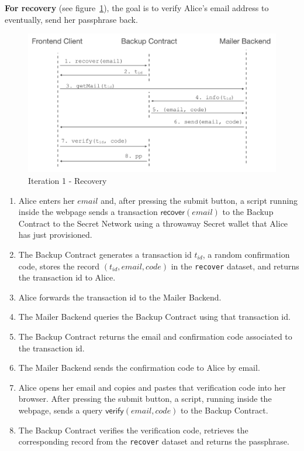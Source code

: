 \documentclass[runningheads]{llncs}
\newcommand{\ms}[1]{\ensuremath{\mathsf{#1}}}
\begin{document}
{\bf For recovery} (see figure~\ref{it1:recovery}), the goal is to verify Alice's email address to eventually, send her passphrase back. 

\begin{figure}[t]
  \includegraphics[width=\linewidth]{./media/media-002.png}
  \caption{Iteration 1 - Recovery}
  \label{it1:recovery}
\end{figure}

\begin{enumerate}
\item Alice enters her $email$ and, after pressing the submit button, a script running inside the webpage sends a transaction {\bf $\ms{recover}(email)$} to the Backup Contract to the Secret Network using a throwaway Secret wallet that Alice has just provisioned. 
\item The Backup Contract generates a transaction id $t_{id}$, a random confirmation code, stores the record $(t_{id}, email, code)$ in the {\tt recover} dataset, and returns the transaction id to Alice.
\item Alice forwards the transaction id to the Mailer Backend. 
\item The Mailer Backend queries the Backup Contract using that transaction id. 
\item The Backup Contract returns the email and confirmation code associated to the transaction id. 
\item The Mailer Backend sends the confirmation code to Alice by email. 
\item Alice opens her email and copies and pastes that verification code into her browser. After pressing the submit button, a script, running inside the webpage, sends a query $\ms{verify}(email, code)$ to the Backup Contract. 
\item The Backup Contract verifies the verification code, retrieves the corresponding record from the {\tt recover} dataset and returns the passphrase.
\end{enumerate}
\end{document}
